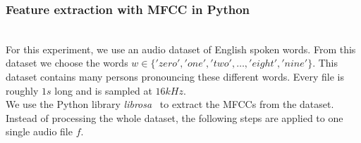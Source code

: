 
\subsubsection{Feature extraction with MFCC in Python}~\label{librosa}~\\

For this experiment, we use an audio dataset of English spoken
words\cite{DBLP:journals/corr/abs-1804-03209}. From this dataset we choose the
words $w \in \{'zero', 'one', 'two', \dots , 'eight', 'nine'\}$. This dataset
contains many persons pronouncing these different words.  Every file is roughly
$1s$ long and is sampled at $16kHz$.\\

We use the Python library \textit{librosa}~\cite{librosa} to extract the MFCCs from the
dataset. Instead of processing the whole dataset, the following steps are
applied to one single audio file $f$.\\

